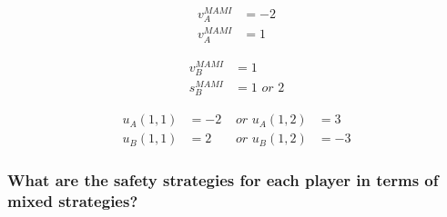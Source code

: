 \documentclass[11pt]{article}
\begin{document}
    \begin{minipage}{0.1\textwidth}
        \begin{align*}
            v_A^{MAMI} &= -2\\
            v_A^{MAMI} &= 1
        \end{align*}
    \end{minipage}
    \begin{minipage}{0.4\textwidth}
        \begin{align*}
            v_B^{MAMI} &= 1\\
            s_B^{MAMI} &= 1 \textit{ or } 2
        \end{align*}
    \end{minipage}
    \begin{minipage}{0.6\textwidth}
        \begin{align*}
            u_A(1, 1) &= -2 &\textit{   or   } u_A(1, 2) &= 3\\
            u_B(1, 1) &= 2  &\textit{   or   } u_B(1, 2) &= -3
        \end{align*}
    \end{minipage}

    \subsubsection{What are the safety strategies for each player in terms of mixed strategies?}
\end{document}
